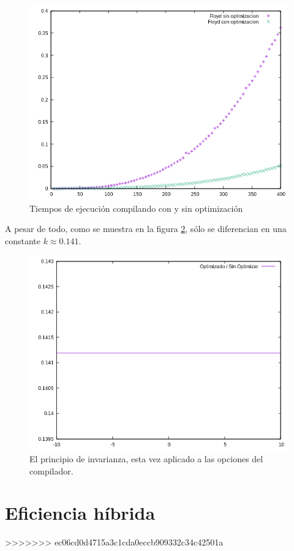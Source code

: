 \documentclass{article}
\begin{document}
\begin{figure}[H]
	\centering
	\includegraphics[totalheight=8cm]{img/optimizacion_floyd}
	\caption{Tiempos de ejecución compilando con y sin optimización}
	\label{fig:optimizacion_floyd}
\end{figure}

A pesar de todo, como se muestra en la figura \ref{fig:optimizacion_cociente}, sólo se diferencian en una constante $k \approx 0.141 $.
\begin{figure}[H]
	\centering
	\includegraphics[totalheight=8cm]{img/optimizacion_cociente}
	\caption{El principio de invarianza, esta vez aplicado a las opciones del compilador.}
	\label{fig:optimizacion_cociente}
\end{figure}

\section{Eficiencia híbrida}
>>>>>>> ec06cd0d4715a3c1cda0eccb909332c34c42501a
\end{document}
